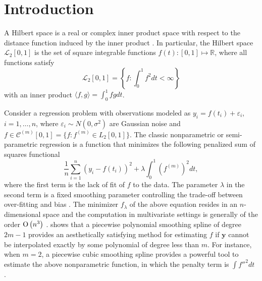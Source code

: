 

\section{Introduction}

A Hilbert space is a real or complex inner product space with respect to the distance function induced by the inner product \citep{dieudonne2013foundations}. In particular, the Hilbert space $\mathcal{L}_2[0,1]$ is the set of square integrable functions $f(t):[0,1]\mapsto \mathbb{R}$, where all functions satisfy 
\begin{equation*}
\mathcal{L}_2[0,1] =\left\lbrace f:\int_0^1f^2dt <\infty \right\rbrace
\end{equation*}
with an inner product $\langle f,g\rangle=\int_0^1fgdt$. 

Consider a regression problem with observations modeled as $y_i = f(t_i)+\varepsilon_i$, $i=1,\ldots,n$, where $\varepsilon_i\sim N(0,\sigma^2)$ are \iid Gaussian noise and $f\in\mathcal{C}^{(m)}[0,1]=\{f:f^{(m)}\in \mathit{L}_2[0,1]\}$. The classic nonparametric or semi-parametric regression is a function that minimizes the following penalized sum of squares functional 
\begin{equation}\label{GaussianProcessGeneralObjective}
\frac{1}{n}\sum_{i=1}^{n}\left( y_i-f(t_i) \right)^2 + \lambda \int_{0}^{1} \left( f^{(m)}\right)^2dt, 
\end{equation}
where the first term is the lack of fit of $f$ to the data. The parameter $\lambda$ in the second term is a fixed smoothing parameter controlling the trade-off between over-fitting and bias \citep{esl2009}. The minimizer $f_\lambda$ of the above equation resides in an $n$-dimensional space and the computation in multivariate settings is generally of the order ${\rm O}\left(n^3\right)$ \citep{kim2004smoothing}. \cite{schoenberg1964spline} shows that a piecewise polynomial smoothing spline of degree $2m-1$ provides an aesthetically satisfying method for estimating $f$ if $\mathbf{y}$ cannot be interpolated exactly by some polynomial of degree less than $m$. For instance, when $m=2$, a piecewise cubic smoothing spline provides a powerful tool to estimate the above nonparametric function, in which the penalty term is $\int f''^2dt$ \citep{hastie1990generalized}. 


